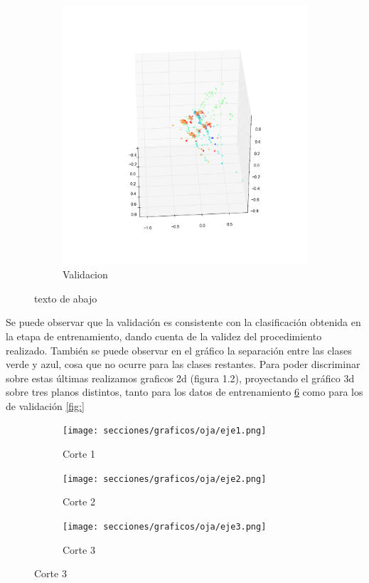 \begin{figure}
\begin{subfigure}[b]{0.5\textwidth}
                \includegraphics[width=\linewidth]{secciones/graficos/oja/2_train.png}
                \caption{Validacion}
                \label{fig: ej1_oja_3d_2_valid}
        \end{subfigure}
        \caption{texto de abajo}
        \label{fig: ej1_oja_3d_2}
\end{figure}


\par Se puede observar que la validación es consistente con la clasificación obtenida en la etapa de entrenamiento, dando cuenta de la validez del procedimiento realizado. También se puede observar en el gráfico la separación entre las clases verde y azul, cosa que no ocurre para las clases restantes. Para poder discriminar sobre estas últimas realizamos graficos 2d (figura 1.2), proyectando el gráfico 3d sobre tres planos distintos, tanto para los datos de entrenamiento \ref{fig: ej1_oja_eje_3}  como para los de validación \ref{fig:}  

\begin{figure}[H]
        \begin{subfigure}[b]{0.33\textwidth}
                \texttt{[image: secciones/graficos/oja/eje1.png]}
                \caption{Corte 1}
                \label{fig: ej1_oja_eje_1}
        \end{subfigure}
        \begin{subfigure}[b]{0.33\textwidth}
                \texttt{[image: secciones/graficos/oja/eje2.png]}
                \caption{Corte 2}
                \label{fig: ej1_oja_eje_2}
        \end{subfigure}
        \begin{subfigure}[b]{0.33\textwidth}
                \texttt{[image: secciones/graficos/oja/eje3.png]}
                \caption{Corte 3}
                \label{fig: ej1_oja_eje_3}
        \end{subfigure}
\end{figure}



